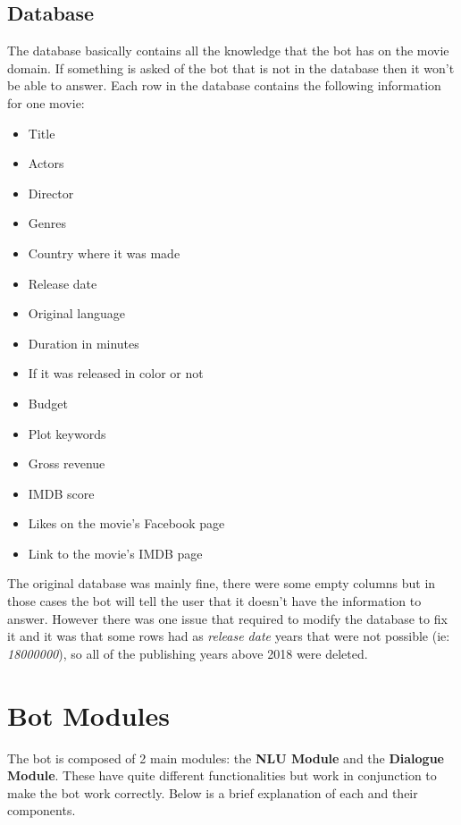 \documentclass[11pt,a4paper]{article}
\begin{document}
	
	\subsection{Database}
	\label{ssec-database}
		
		The database basically contains all the knowledge that the bot has on the movie domain. If something is asked of the bot that is not in the database then it won't be able to answer. Each row in the database contains the following information for one movie:
		
		\begin{itemize}
		\setlength\itemsep{-0.48em}
			\item Title 
			\item Actors
			\item Director
			\item Genres
			\item Country where it was made
			\item Release date
			\item Original language
			\item Duration in minutes
			\item If it was released in color or not
			\item Budget
			\item Plot keywords
			\item Gross revenue
			\item IMDB score
			\item Likes on the movie's Facebook page
			\item Link to the movie's IMDB page
		\end{itemize}

		
		The original database was mainly fine, there were some empty columns but in those cases the bot will tell the user that it doesn't have the information to answer. However there was one issue that required to modify the database to fix it and it was that some rows had as \textit{release date} years that were not possible (ie: \textit{18000000}), so all of the publishing years above 2018 were deleted.


\section{Bot Modules}
\label{sec-bot-modules}

	The bot is composed of 2 main modules: the \textbf{NLU Module} and the \textbf{Dialogue Module}. These have quite different functionalities but work in conjunction to make the bot work correctly. Below is a brief explanation of each and their components.
\end{document}
